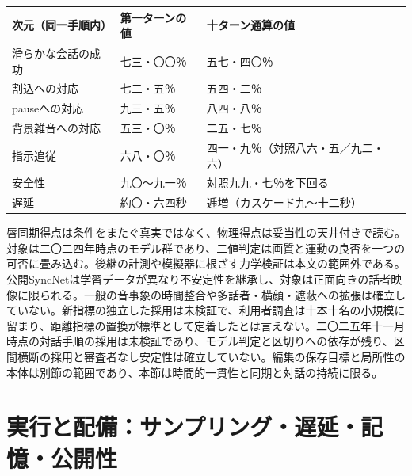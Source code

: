 \documentclass[lualatex,a4paper,10pt]{jlreq}
\begin{document}
\begin{center}
\small
\begin{tabularx}{\textwidth}{@{}p{}p{}X@{}}
\toprule
次元（同一手順内） & 第一ターンの値 & 十ターン通算の値 \\
\midrule
滑らかな会話の成功 & 七三・〇〇％ & 五七・四〇％ \\
割込への対応 & 七二・五％ & 五四・二％ \\
pauseへの対応 & 九三・五％ & 八四・八％ \\
背景雑音への対応 & 五三・〇％ & 二五・七％ \\
指示追従 & 六八・〇％ & 四一・九％（対照八六・五／九二・六） \\
安全性 & 九〇〜九一％ & 対照九九・七％を下回る \\
遅延 & 約〇・六四秒 & 逓増（カスケード九〜十二秒） \\
\bottomrule
\end{tabularx}
\end{center}
\autocite{btd135}

\begin{claimboundary}[本節の読解上の境界]
唇同期得点は条件をまたぐ真実ではなく、物理得点は妥当性の天井付きで読む。対象は二〇二四年時点のモデル群であり、二値判定は画質と運動の良否を一つの可否に畳み込む。後継の計測や模擬器に根ざす力学検証は本文の範囲外である。公開SyncNetは学習データが異なり不安定性を継承し、対象は正面向きの話者映像に限られる。一般の音事象の時間整合や多話者・横顔・遮蔽への拡張は確立していない。新指標の独立した採用は未検証で、利用者調査は十本十名の小規模に留まり、距離指標の置換が標準として定着したとは言えない。二〇二五年十一月時点の対話手順の採用は未検証であり、モデル判定と区切りへの依存が残り、区間横断の採用と審査者なし安定性は確立していない。編集の保存目標と局所性の本体は別節の範囲であり、本節は時間的一貫性と同期と対話の持続に限る。
\end{claimboundary}

\section{実行と配備：サンプリング・遅延・記憶・公開性}
\label{sec:runtime}
\end{document}
